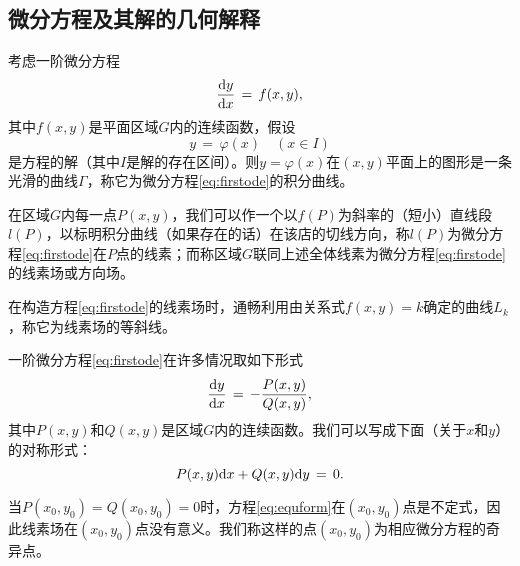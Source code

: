 \subsection{微分方程及其解的几何解释}
考虑一阶微分方程
\begin{equation}\label{eq:firstode}
\frac{\mathrm{d} y}{\mathrm{d} x}\,=\,f(x,y),
\end{equation}
其中$f(x,y)$是平面区域$G$内的连续函数，假设
\begin{equation}\label{eq:ode:soldom}
y\,=\,\varphi(x)\quad(x\in I)
\end{equation}
是方程的解（其中$I$是解的存在区间）。则$y=\varphi(x)$在$(x,y)$平面上的图形是一条光滑的曲线$\Gamma$，称它为微分方程\eqref{eq:firstode}的{\heiti 积分曲线}。\par
在区域$G$内每一点$P(x,y)$，我们可以作一个以$f(P)$为斜率的（短小）直线段$l(P)$，以标明积分曲线（如果存在的话）在该店的切线方向，称$l(P)$为微分方程\eqref{eq:firstode}在$P$点的{\heiti 线素}；而称区域$G$联同上述全体线素为微分方程\eqref{eq:firstode}的{\heiti 线素场}或{\heiti 方向场}。\par
在构造方程\eqref{eq:firstode}的线素场时，通畅利用由关系式$f(x,y)=k$确定的曲线$L_k$，称它为线素场的{\heiti 等斜线}。\par
一阶微分方程\eqref{eq:firstode}在许多情况取如下形式
\begin{equation}\label{eq:equform}
\frac{\mathrm{d} y}{\mathrm{d} x}\,=\,-\dfrac{P(x,y)}{Q(x,y)},
\end{equation}
其中$P(x,y)$和$Q(x,y)$是区域$G$内的连续函数。我们可以写成下面（关于$x$和$y$）的对称形式：
\begin{equation}\label{eq:equform2}
P(x,y)\mathrm{d} x+Q(x,y)\mathrm{d} y\,=\,0.
\end{equation}\par
当$P(x_0,y_0)=Q(x_0,y_0)=0$时，方程\eqref{eq:equform}在$(x_0,y_0)$点是不定式，因此线素场在$(x_0,y_0)$点没有意义。我们称这样的点$(x_0,y_0)$为相应微分方程的{\heiti 奇异点}。